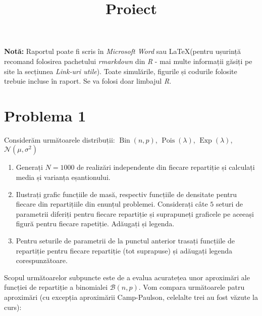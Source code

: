 \documentclass[]{article}
\title{Proiect}
\author{}
\date{}
\begin{document}
\maketitle

\thispagestyle{fancy}

\textbf{Notă:} Raportul poate fi scris în \emph{Microsoft Word} sau
\LaTeX (pentru ușurință recomand folosirea pachetului \emph{rmarkdown}
din \emph{R} - mai multe informații găsiți pe site la secțiunea
\emph{Link-uri utile}). Toate simulările, figurile și codurile folosite
trebuie incluse în raport. Se va folosi doar limbajul \emph{R}.

\section{Problema 1}\label{problema-1}

Considerăm următoarele distribuții: \(\operatorname{Bin}(n,p)\),
\(\operatorname{Pois}(\lambda)\), \(\operatorname{Exp}(\lambda)\),
\(\mathcal{N}(\mu, \sigma^2)\)

\begin{enumerate}
\def\labelenumi{\arabic{enumi}.}
\item
  Generați \(N=1000\) de realizări independente din fiecare repartiție
  și calculați media și varianța eșantionului.
\item
  Ilustrați grafic funcțiile de masă, respectiv funcțiile de densitate
  pentru fiecare din repartițiile din enunțul problemei. Considerați
  câte \(5\) seturi de parametrii diferiți pentru fiecare repartiție și
  suprapuneți graficele pe aceeași figură pentru fiecare rapetiție.
  Adăugați și legenda.
\item
  Pentru seturile de parametrii de la punctul anterior trasați funcțiile
  de repartiție pentru fiecare repartiție (tot suprapuse) și adăugați
  legenda corespunzătoare.
\end{enumerate}

Scopul următoarelor subpuncte este de a evalua acuratețea unor
aproximări ale funcției de repartiție a binomialei \(\mathcal{B}(n,p)\).
Vom compara următoarele patru aproximări (cu excepția aproximării
Camp-Paulson, celelalte trei au fost văzute la curs):
\end{document}

